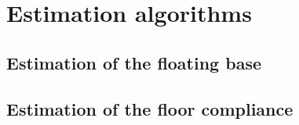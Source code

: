 \documentclass[12pt,a4paper,twoside]{article}
\begin{document}
\section{Estimation algorithms} 
\label{sec:estimation}

\subsection{Estimation of the floating base} 
\label{sec:estimationFloatingBase}

\subsection{Estimation of the floor compliance} 
\label{sec:estimationFloorCompliance}



\end{document}
